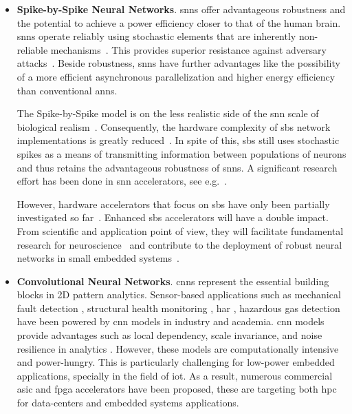 \begin{itemize}

\item \textbf{Spike-by-Spike Neural Networks}. \glspl{snn} offer advantageous robustness and the potential to achieve a power efficiency closer to that of the human brain. \glspl{snn} operate reliably using stochastic elements that are inherently non-reliable mechanisms~\cite{mcdonnell2011benefits}. This provides superior resistance against adversary attacks~\cite{ernst2007efficient, Dapello2020.06.16.154542}. Beside robustness, \glspl{snn} have further advantages like the possibility of a more efficient asynchronous parallelization and higher energy efficiency than conventional \glspl{ann}.

The Spike-by-Spike model is on the less realistic side of the \gls{snn} scale of biological realism~\cite{rotermund2019Backpropagation,ernst2007efficient}. Consequently, the hardware complexity of \gls{sbs} network implementations is greatly reduced~\cite{rotermund2018massively}. In spite of this, \gls{sbs} still uses stochastic spikes as a means of transmitting information between populations of neurons and thus retains the advantageous robustness of \glspl{snn}. A significant research effort has been done in \gls{snn} accelerators, see e.g.~\cite{roy2019towards,bouvier2019spiking,
	young2019review,TrueNorth_Trans15,Spinnaker_Trans13,davies2018loihi}.

However, hardware accelerators that focus on \gls{sbs} have only been partially investigated so far~\cite{rotermund2018massively}. Enhanced \gls{sbs} accelerators will have a double impact. From scientific and application point of view, they will facilitate fundamental research for neuroscience~\cite{ernst2007efficient,rotermund2019recurrentsbs, dayan2001theoretical} and contribute to the deployment of robust neural networks in small embedded systems~\cite{nevarez2020accelerator}.

\item \textbf{Convolutional Neural Networks}. \glspl{cnn} represent the essential building blocks in 2D pattern analytics. Sensor-based applications such as mechanical fault detection \cite{li2019sensor,dong2018rolling}, structural health monitoring \cite{nagayama2007structural}, \gls{har} \cite{wang2019deep}, hazardous gas detection \cite{kim2017hazardous} have been powered by \gls{cnn} models in industry and academia. \gls{cnn} models provide advantages such as local dependency, scale invariance, and noise resilience in analytics \cite{du2014leveraging}. However, these models are computationally intensive and power-hungry. This is particularly challenging for low-power embedded applications, specially in the field of \gls{iot}. As a result, numerous commercial \gls{asic} and \gls{fpga} accelerators have been proposed, these are targeting both \gls{hpc} for data-centers and embedded systems applications.


\end{itemize}
